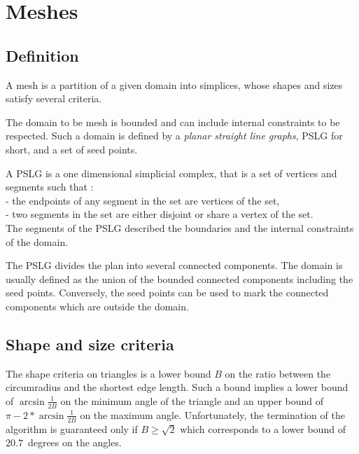 
\section{Meshes}
\label{sec:Mesh_2_meshes}


\subsection{Definition}
\label{sec:Mesh_2_meshes_definition}

A mesh is a partition of a given domain into simplices, whose shapes
and sizes satisfy several criteria.

The domain to be mesh is bounded and can include internal constraints
to be respected.  Such a domain is defined by a \emph{planar straight
  line graphs}, PSLG for short, and a set of seed points.

A PSLG is a one dimensional simplicial complex, that
is a set of vertices and segments such that : \\
- the endpoints of any segment in the set are vertices of the set, \\
- two segments in the set are either disjoint or share a vertex of the 
set. \\
The segments of the PSLG described the boundaries and the internal
constraints of the domain.

The PSLG divides the plan into several connected components.  The
domain is usually defined as the union of the bounded connected
components including the seed points.  Conversely, the seed points can
be used to mark the connected components which are outside the domain.

\subsection{Shape and size criteria}
\label{sec:Mesh_2_criteria}

The shape criteria on triangles is a lower bound $B$ on the ratio
between the circumradius and the shortest edge length.  Such a bound
implies a lower bound of $\arcsin{\frac{1}{2B}}$ on the minimum angle
of the triangle and an upper bound of $\pi - 2* \arcsin{\frac{1}{2B}}$
on the maximum angle.  Unfortunately, the termination of the algorithm
is guaranteed only if $B \ge \sqrt{2}$ which corresponds to a lower
bound of $20.7$~degrees on the angles.

